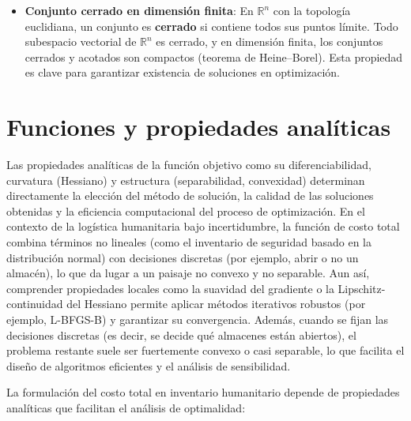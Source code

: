 \documentclass[
  spanish,
  us-letterpaper,
]{scrreprt}
\providecommand{\tightlist}{%
  \setlength{\itemsep}{0pt}\setlength{\parskip}{0pt}}
\numberwithin{equation}{section}
\begin{document}
\begin{itemize}
\tightlist
\item
  \textbf{Conjunto cerrado en dimensión finita}: En \(\mathbb{R}^n\) con
  la topología euclidiana, un conjunto es \textbf{cerrado} si contiene
  todos sus puntos límite. Todo subespacio vectorial de \(\mathbb{R}^n\)
  es cerrado, y en dimensión finita, los conjuntos cerrados y acotados
  son compactos (teorema de Heine--Borel). Esta propiedad es clave para
  garantizar existencia de soluciones en optimización.
\end{itemize}

\section{Funciones y propiedades analíticas}\label{sec-funcion_CD}

Las propiedades analíticas de la función objetivo como su
diferenciabilidad, curvatura (Hessiano) y estructura (separabilidad,
convexidad) determinan directamente la elección del método de solución,
la calidad de las soluciones obtenidas y la eficiencia computacional del
proceso de optimización. En el contexto de la logística humanitaria bajo
incertidumbre, la función de costo total combina términos no lineales
(como el inventario de seguridad basado en la distribución normal) con
decisiones discretas (por ejemplo, abrir o no un almacén), lo que da
lugar a un paisaje no convexo y no separable. Aun así, comprender
propiedades locales como la suavidad del gradiente o la
Lipschitz-continuidad del Hessiano permite aplicar métodos iterativos
robustos (por ejemplo, L-BFGS-B) y garantizar su convergencia. Además,
cuando se fijan las decisiones discretas (es decir, se decide qué
almacenes están abiertos), el problema restante suele ser fuertemente
convexo o casi separable, lo que facilita el diseño de algoritmos
eficientes y el análisis de sensibilidad.

La formulación del costo total en inventario humanitario depende de
propiedades analíticas que facilitan el análisis de optimalidad:
\end{document}
